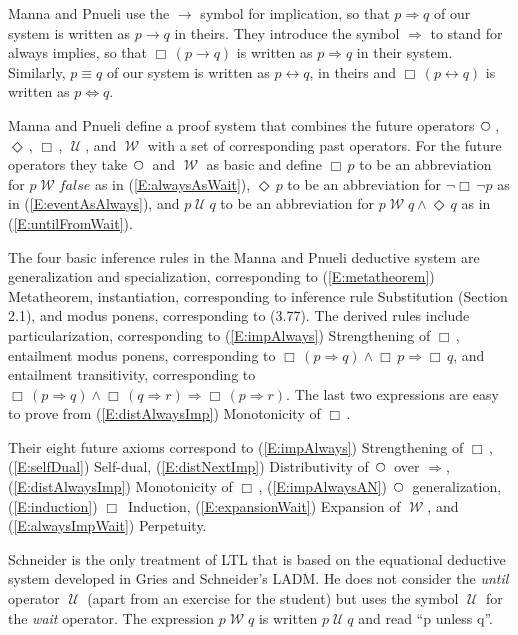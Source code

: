 \documentclass[12pt, fleqn, leqno]{article}
\newcommand{\impl}{\ensuremath{\Rightarrow}}        %
\newcommand{\Until}{\;\mathcal{U}\;}
\newcommand{\Wait}{\;\mathcal{W}\;}
\newcommand{\Next}{\;\,\text{\raisebox{3.5pt}{\circle{6}}}}
\newcommand{\Event}{\Diamond\,}
\newcommand{\Always}{\Box\,}
\begin{document}
Manna and Pnueli \cite{Manna} use the $\rightarrow$ symbol for implication, so that $p\impl q$ of our system is written as $p\rightarrow q$ in theirs.
They introduce the symbol $\impl$ to stand for always implies, so that $\Always(p\rightarrow q)$ is written as $p\impl q$ in their system.
Similarly, $p\equiv q$ of our system is written as $p\leftrightarrow q$, in theirs and $\Always(p\leftrightarrow q)$ is written as $p\Leftrightarrow q$.

Manna and Pnueli define a proof system that combines the future operators $\Next$, $\Event$, $\Always$, $\Until$, and $\Wait$ with a set of corresponding past operators.
For the future operators they take $\Next$ and $\Wait$ as basic and define $\Always p$ to be an abbreviation for $p\Wait \mathit{false}$ as in (\ref{E:alwaysAsWait}), $\Event p$ to be an abbreviation for $\neg\Always\neg p$ as in (\ref{E:eventAsAlways}), and $p\Until q$ to be an abbreviation for $p\Wait q \land \Event q$ as in (\ref{E:untilFromWait}).

The four basic inference rules in the Manna and Pnueli deductive system are generalization and specialization, corresponding to (\ref{E:metatheorem}) Metatheorem, instantiation, corresponding to inference rule Substitution (Section 2.1), and modus ponens, corresponding to (3.77).
The derived rules include particularization, corresponding to (\ref{E:impAlways}) Strengthening of $\Always$, entailment modus ponens, corresponding to $\Always(p\impl q)\land\Always p \impl \Always q$, and entailment transitivity, corresponding to $\Always(p\impl q)\land \Always(q\impl r) \impl \Always(p\impl r)$.
The last two expressions are easy to prove from (\ref{E:distAlwaysImp}) Monotonicity of $\Always$.

Their eight future axioms correspond to (\ref{E:impAlways}) Strengthening of $\Always$, (\ref{E:selfDual}) Self-dual, (\ref{E:distNextImp}) Distributivity of $\Next$ over $\impl$, (\ref{E:distAlwaysImp}) Monotonicity of $\Always$, (\ref{E:impAlwaysAN}) $\Next$ generalization, (\ref{E:induction}) $\Always$ Induction, (\ref{E:expansionWait}) Expansion of $\Wait$, and (\ref{E:alwaysImpWait}) Perpetuity.

Schneider \cite{Schn} is the only treatment of LTL that is based on the equational deductive system developed in Gries and Schneider's LADM. \cite{LADM}
He does not consider the \textit{until} operator $\Until$ (apart from an exercise for the student) but uses the symbol $\Until$ for the \textit{wait} operator.
The expression $p\Wait q$ is written $p\Until q$ and read ``p unless q''.
\end{document}
